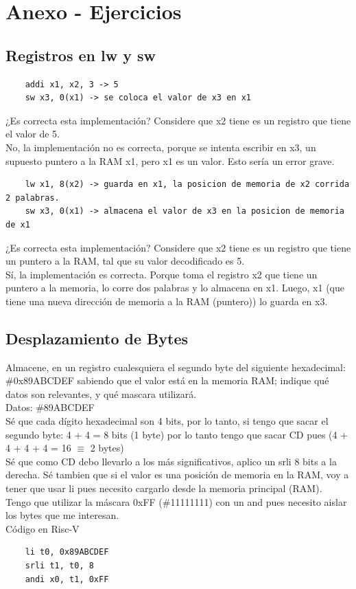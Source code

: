 \documentclass[10pt,a4paper]{article}
\begin{document}
\section*{Anexo - Ejercicios}
\subsection*{Registros en lw y sw}
\label{subsec:punteros_ram_registros}
\begin{lstlisting}
    addi x1, x2, 3 -> 5
    sw x3, 0(x1) -> se coloca el valor de x3 en x1
\end{lstlisting}
¿Es correcta esta implementación? Considere que x2 tiene es un registro que tiene el valor de 5. \\
No, la implementación no es correcta, porque se intenta escribir en x3, un supuesto puntero a la RAM x1, pero x1 es un valor. Esto sería un error grave. \\ 
\begin{lstlisting}
    lw x1, 8(x2) -> guarda en x1, la posicion de memoria de x2 corrida 2 palabras.
    sw x3, 0(x1) -> almacena el valor de x3 en la posicion de memoria de x1
\end{lstlisting}
¿Es correcta esta implementación? Considere que x2 tiene es un registro que tiene un puntero a la RAM, tal que su valor decodificado es 5. \\
Sí, la implementación es correcta. Porque toma el registro x2 que tiene un puntero a la memoria, lo corre dos palabras y lo almacena en x1. Luego, x1 (que tiene una nueva dirección de memoria a la RAM (puntero)) lo guarda en x3. \\ 
\subsection*{Desplazamiento de Bytes}
\label{subsec:desplazamiento_bytes}
Almacene, en un registro cualesquiera el segundo byte del siguiente hexadecimal: \#0x89ABCDEF sabiendo que el valor está en la memoria RAM; indique qué datos son relevantes, y qué mascara utilizará. \\
Datos: \#89ABCDEF \\
Sé que cada dígito hexadecimal son 4 bits, por lo tanto, si tengo que sacar el segundo byte: 4 + 4 = 8 bits (1 byte) por lo tanto tengo que sacar CD pues (4 + 4 + 4 + 4 = 16 $ \equiv $ 2 bytes) \\
Sé que como CD debo llevarlo a los más significativos, aplico un srli 8 bits a la derecha.
Sé tambien que si el valor es una posición de memoria en la RAM, voy a tener que usar li pues necesito cargarlo desde la memoria principal (RAM). \\
Tengo que utilizar la máscara 0xFF (\#11111111) con un and pues necesito aislar los bytes que me interesan. \\
Código en Risc-V
\begin{lstlisting}
    li t0, 0x89ABCDEF
    srli t1, t0, 8
    andi x0, t1, 0xFF
\end{lstlisting}
\end{document}
